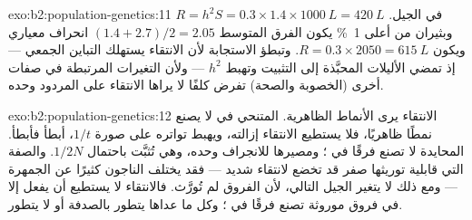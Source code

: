 \begin{solution}{exo:b2:population-genetics:11}
$R = h^{2}S = 0.3\times 1.4\times \qty{1000}{L} = \qty{420}{L}$ في
الجيل. وبثيران من أعلى \qty{1}{\%} يكون الفرق
المتوسط $(1.4 + 2.7)/2 = 2.05$ انحراف معياري ويكون $R =
0.3\times 2050 = \qty{615}{L}$. وتبطؤ الاستجابة لأن الانتقاء
يستهلك التباين الجمعي --- إذ تمضي الأليلات المحبَّذة إلى التثبيت
وتهبط $h^{2}$ --- ولأن التغيرات المرتبطة في صفات
أخرى (الخصوبة والصحة) تفرض كلفًا لا يراها الانتقاء على
المردود وحده.
\end{solution}

\begin{solution}{exo:b2:population-genetics:12}
الانتقاء يرى الأنماط الظاهرية.  المتنحي في 
لا يصنع نمطًا ظاهريًا، فلا يستطيع الانتقاء إزالته، ويهبط
تواتره على صورة $1/t$، أبطأ فأبطأ.  المحايدة
لا تصنع فرقًا في ؛ ومصيرها للانجراف وحده، وهي
تُثبَّت باحتمال $1/2N$. والصفة التي قابلية توريثها صفر
قد تخضع لانتقاء شديد --- فقد يختلف الناجون كثيرًا عن
الجمهرة --- ومع ذلك لا يتغير الجيل التالي، لأن
الفروق لم تُورَّث. فالانتقاء لا يستطيع أن يفعل إلا في
فروق موروثة تصنع فرقًا في ؛ وكل ما عداها
يتطور بالصدفة أو لا يتطور.
\end{solution}

